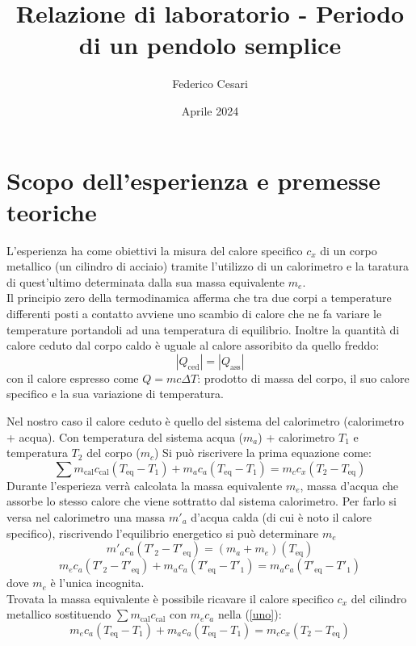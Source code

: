 \documentclass{article}
\title{Relazione di laboratorio - Periodo di un pendolo semplice}
\author{Federico Cesari}
\date{Aprile 2024}
\begin{document}
	
	\tableofcontents
	
	\newpage
	\section*{Scopo dell’esperienza e premesse teoriche}
	L'esperienza ha come obiettivi la misura del calore specifico \(c_{x}\) di un corpo metallico (un cilindro di acciaio) tramite l'utilizzo di un calorimetro e la taratura di quest'ultimo determinata dalla sua massa equivalente \(m_{e}\). \\
	
	\noindent
	Il principio zero della termodinamica afferma che tra due corpi a temperature differenti posti a contatto avviene uno scambio di calore che ne fa variare le temperature portandoli ad una temperatura di equilibrio. Inoltre la quantità di calore ceduto dal corpo caldo è uguale al calore assoribito da quello freddo:
	\[ 
	|Q_{\text{ced}}| = |Q_{\text{ass}}|
	\]
	con il calore espresso come \(Q = mc\Delta T\): prodotto di massa del corpo, il suo calore specifico e la sua variazione di temperatura. 
	
	Nel nostro caso il calore ceduto è quello del sistema del calorimetro (calorimetro + acqua). Con temperatura del sistema acqua (\(m_{a}\)) + calorimetro \(T_{1}\) e temperatura \(T_{2}\) del corpo (\(m_{c}\))  Si può riscrivere la prima equazione come:
	\begin{equation}\label{uno}
	\sum m_{\text{cal}}c_{\text{cal}}(T_{\text{eq}} - T_{1}) +  m_{a}c_{a}(T_{\text{eq}} - T_{1}) = m_{c}c_{x}(T_{2} - T_{\text{eq}})
	\end{equation}
	Durante l'esperieza verrà calcolata la massa equivalente \(m_{e}\), massa d'acqua che assorbe lo stesso calore che viene sottratto dal sistema calorimetro. Per farlo si versa nel calorimetro una massa \(m'_{a}\) d'acqua calda (di cui è noto il calore specifico), riscrivendo l'equilibrio energetico si può determinare \(m_{e}\)
	\[ 
	m'_{a}c_{a}(T'_{2} - T'_{\text{eq}}) = (m_{a} + m_{e})(T_{\text{eq}})
	\]
	 \[ 
	 m_{e}c_{a}(T'_{2} - T'_{\text{eq}}) +  m_{a}c_{a}(T'_{\text{eq}} - T'_{1}) = m_{a}c_{a}(T'_{\text{eq}} - T'_{1})
	\]
	 dove \(m_{e}\) è l'unica incognita. \\
	 
	
	 \noindent
	 Trovata la massa equivalente è possibile ricavare il calore specifico \(c_{x}\) del cilindro metallico sostituendo \(\sum m_{\text{cal}}c_{\text{cal}}\) con \(m_{e}c_{a}\) nella (\ref{uno}):
	 \[ 
	 m_{e}c_{a}(T_{\text{eq}} - T_{1}) +  m_{a}c_{a}(T_{\text{eq}} - T_{1}) = m_{c}c_{x}(T_{2} - T_{\text{eq}})
	 \]
	
\end{document}
